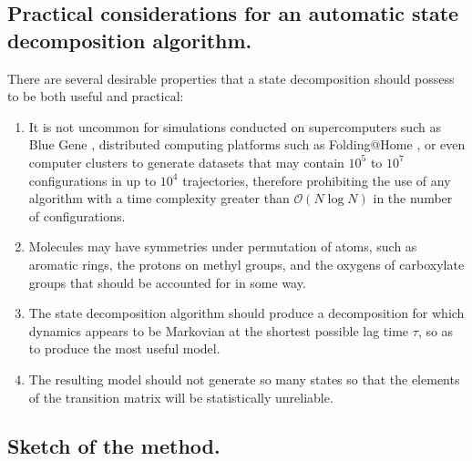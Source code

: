 \subsection{Practical considerations for an automatic state decomposition algorithm.}
\label{automatic:section:methods:desiderata}

There are several desirable properties that a state decomposition should possess to be both useful and practical:
\begin{enumerate}
  \item It is not uncommon for simulations conducted on supercomputers such as Blue Gene \cite{fitch:2003a,germain:2005a}, distributed computing platforms such as Folding@Home \cite{pande:2000a,pande:2003a}, or even computer clusters to generate datasets that may contain $10^5$ to $10^7$ configurations in up to $10^4$ trajectories, therefore prohibiting the use of any algorithm with a time complexity greater than $\mathcal{O}(N \log N)$ in the number of configurations.
  \item Molecules may have symmetries under permutation of atoms, such as aromatic rings, the protons on methyl groups, and the oxygens of carboxylate groups that should be accounted for in some way.
  \item The state decomposition algorithm should produce a decomposition for which dynamics appears to be Markovian at the shortest possible lag time $\tau$, so as to produce the most useful model.
  \item The resulting model should not generate so many states so that the elements of the transition matrix will be statistically unreliable.
\end{enumerate}

\subsection{Sketch of the method.}
\label{automatic:section:methods:sketch}

